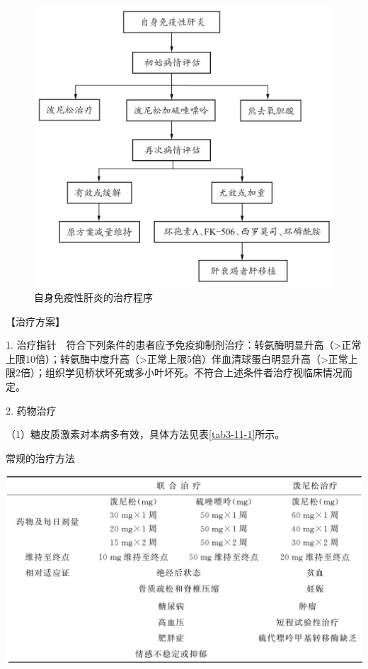\begin{figure}[!htbp]
 \centering
 \includegraphics{./images/Image00100.jpg}
 \captionsetup{justification=centering}
 \caption{自身免疫性肝炎的治疗程序}
 \label{fig3-11-1}
  \end{figure} 

【治疗方案】

1.
治疗指针　符合下列条件的患者应予免疫抑制剂治疗：转氨酶明显升高（\textgreater{}正常上限10倍）；转氨酶中度升高（\textgreater{}正常上限5倍）伴血清球蛋白明显升高（\textgreater{}正常上限2倍）；组织学见桥状坏死或多小叶坏死。不符合上述条件者治疗视临床情况而定。

2. 药物治疗

（1）糖皮质激素对本病多有效，具体方法见表\ref{tab3-11-1}所示。

\begin{table}[htbp]
\centering
\caption{常规的治疗方法}
\label{tab3-11-1}
\includegraphics{./images/Image00101.jpg}
\end{table}

